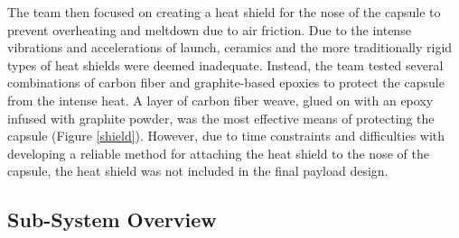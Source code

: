 \documentclass{article}
\begin{document}
\begin{doublespace}
		\indent The team then focused on creating a heat shield for the nose of the capsule to prevent overheating and meltdown due to air friction. Due to the intense vibrations and accelerations of launch, ceramics and the more traditionally rigid types of heat shields were deemed inadequate. Instead, the team tested several combinations of carbon fiber and graphite-based epoxies to protect the capsule from the intense heat. A layer of carbon fiber weave, glued on with an epoxy infused with graphite powder, was the most effective means of protecting the capsule (Figure \ref{shield}). However, due to time constraints and difficulties with developing a reliable method for attaching the heat shield to the nose of the capsule, the heat shield was not included in the final payload design.
	\subsection{Sub-System Overview}

\end{doublespace}
\end{document}
